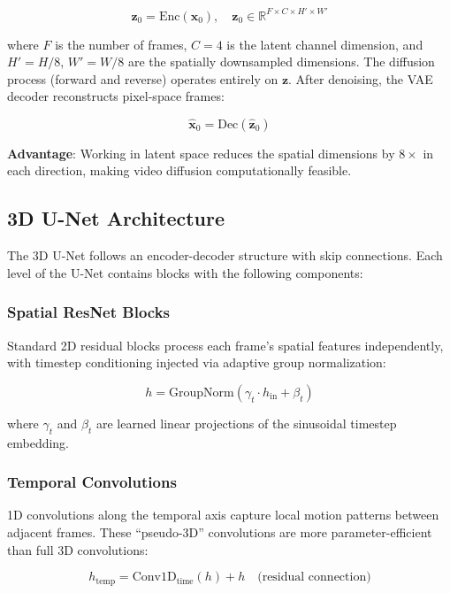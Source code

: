 \documentclass[conference]{IEEEtran}
\begin{document}
\begin{equation}
    \mathbf{z}_0 = \text{Enc}(\mathbf{x}_0), \quad \mathbf{z}_0 \in \mathbb{R}^{F \times C \times H' \times W'}
\end{equation}

where $F$ is the number of frames, $C = 4$ is the latent channel dimension, and $H' = H/8$, $W' = W/8$ are the spatially downsampled dimensions. The diffusion process (forward and reverse) operates entirely on $\mathbf{z}$. After denoising, the VAE decoder reconstructs pixel-space frames:

\begin{equation}
    \hat{\mathbf{x}}_0 = \text{Dec}(\hat{\mathbf{z}}_0)
\end{equation}

\textbf{Advantage}: Working in latent space reduces the spatial dimensions by $8\times$ in each direction, making video diffusion computationally feasible.

\subsection{3D U-Net Architecture}

The 3D U-Net follows an encoder-decoder structure with skip connections. Each level of the U-Net contains blocks with the following components:

\subsubsection{Spatial ResNet Blocks}
Standard 2D residual blocks process each frame's spatial features independently, with timestep conditioning injected via adaptive group normalization:

\begin{equation}
    h = \text{GroupNorm}(\gamma_t \cdot h_{\text{in}} + \beta_t)
\end{equation}

where $\gamma_t$ and $\beta_t$ are learned linear projections of the sinusoidal timestep embedding.

\subsubsection{Temporal Convolutions}
1D convolutions along the temporal axis capture local motion patterns between adjacent frames. These ``pseudo-3D'' convolutions are more parameter-efficient than full 3D convolutions:

\begin{equation}
    h_{\text{temp}} = \text{Conv1D}_{\text{time}}(h) + h \quad \text{(residual connection)}
\end{equation}
\end{document}
